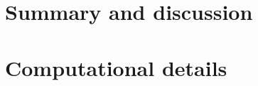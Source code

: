 \documentclass[article]{jss}
\begin{document}









\section{Summary and discussion} \label{sec:summary}



\section*{Computational details}
\end{document}

